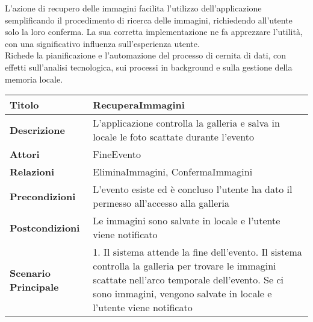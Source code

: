 L'azione di recupero delle immagini facilita l'utilizzo dell'applicazione semplificando il procedimento di ricerca delle immagini, 
richiedendo all'utente solo la loro conferma.
La sua corretta implementazione ne fa apprezzare l'utilità, con una significativo influenza sull'esperienza utente.\\
Richede la pianificazione e l'automazione del processo di cernita di dati, 
con effetti sull'analisi tecnologica, sui processi in background e sulla gestione della memoria locale.
\begin{table}[htb]
    \begin{tabular} {|P{4.5cm}|P{11cm}|}
        \hline
        \textbf{Titolo}                   & RecuperaImmagini                                                                                                                           \\
        \hline
        \textbf{Descrizione}              & L'applicazione controlla la galleria e salva in locale le foto scattate durante l'evento                                                   \\
        \hline
        \textbf{Attori}                   & FineEvento                                                                                                                                 \\
        \hline
        \textbf{Relazioni}                & EliminaImmagini, ConfermaImmagini                                                                                                          \\
        \hline
        \textbf{Precondizioni}            & L'evento esiste ed è concluso\linebreak
        l'utente ha dato il permesso all'accesso alla galleria                                                                                                                         \\
        \hline
        \textbf{Postcondizioni}           & Le immagini sono salvate in locale e l'utente viene notificato                                                                             \\
        \hline
        \textbf{Scenario Principale}      & 1. Il sistema attende la fine dell'evento. Il sistema controlla la galleria per trovare le immagini scattate nell'arco temporale dell'evento. Se ci sono immagini, vengono salvate in locale e l'utente viene notificato                                                                                                  \\

\end{tabular}
\end{table}
